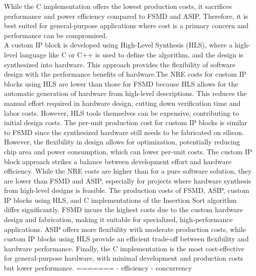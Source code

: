\documentclass[conference]{IEEEtran}
\begin{document}
While the C implementation offers the lowest production costs, it sacrifices performance and power efficiency compared to FSMD and ASIP. Therefore, it is best suited for general-purpose applications where cost is a primary concern and performance can be compromised.\\
A custom IP block is developed using High-Level Synthesis (HLS), where a high-level language like C or C++ is used to define the algorithm, and the design is synthesized into hardware. This approach provides the flexibility of software design with the performance benefits of hardware.The NRE costs for custom IP blocks using HLS are lower than those for FSMD because HLS allows for the automatic generation of hardware from high-level descriptions. This reduces the manual effort required in hardware design, cutting down verification time and labor costs. However, HLS tools themselves can be expensive, contributing to initial design costs. The per-unit production cost for custom IP blocks is similar to FSMD since the synthesized hardware still needs to be fabricated on silicon. However, the flexibility in design allows for optimization, potentially reducing chip area and power consumption, which can lower per-unit costs. The custom IP block approach strikes a balance between development effort and hardware efficiency. While the NRE costs are higher than for a pure software solution, they are lower than FSMD and ASIP, especially for projects where hardware synthesis from high-level designs is feasible.
The production costs of FSMD, ASIP, custom IP blocks using HLS, and C implementations of the Insertion Sort algorithm differ significantly. FSMD incurs the highest costs due to the custom hardware design and fabrication, making it suitable for specialized, high-performance applications. ASIP offers more flexibility with moderate production costs, while custom IP blocks using HLS provide an efficient trade-off between flexibility and hardware performance. Finally, the C implementation is the most cost-effective for general-purpose hardware, with minimal development and production costs but lower performance. 
=======
- efficiency
- concurrency
\end{document}

